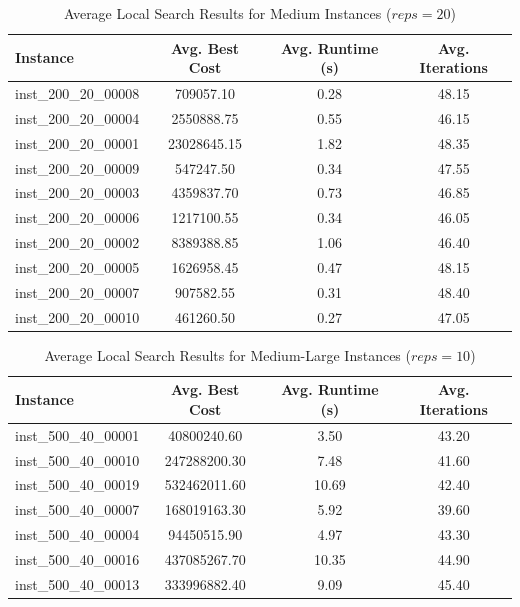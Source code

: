 \documentclass{article}
\begin{document}
\begin{table}[H]
\centering
\caption{Average Local Search Results for Medium Instances ($reps = 20$)}
\hspace*{-1cm}
\begin{tabular}{lccc}
\toprule
\textbf{Instance} & \textbf{Avg. Best Cost} & \textbf{Avg. Runtime (s)} & \textbf{Avg. Iterations} \\
\midrule
inst\_200\_20\_00008 & 709057.10   & 0.28  & 48.15 \\
inst\_200\_20\_00004 & 2550888.75  & 0.55  & 46.15 \\
inst\_200\_20\_00001 & 23028645.15 & 1.82  & 48.35 \\
inst\_200\_20\_00009 & 547247.50   & 0.34  & 47.55 \\
inst\_200\_20\_00003 & 4359837.70  & 0.73  & 46.85 \\
inst\_200\_20\_00006 & 1217100.55  & 0.34  & 46.05 \\
inst\_200\_20\_00002 & 8389388.85  & 1.06  & 46.40 \\
inst\_200\_20\_00005 & 1626958.45  & 0.47  & 48.15 \\
inst\_200\_20\_00007 & 907582.55   & 0.31  & 48.40 \\
inst\_200\_20\_00010 & 461260.50   & 0.27  & 47.05 \\
\bottomrule
\end{tabular}
\label{tab:average_results_200_20}
\end{table}

\begin{table}[H]
\centering
\caption{Average Local Search Results for Medium-Large Instances ($reps=10$)}
\hspace*{-1cm}
\begin{tabular}{lccc}
\toprule
\textbf{Instance} & \textbf{Avg. Best Cost} & \textbf{Avg. Runtime (s)} & \textbf{Avg. Iterations} \\
\midrule
inst\_500\_40\_00001 & 40800240.60   & 3.50  & 43.20 \\
inst\_500\_40\_00010 & 247288200.30  & 7.48  & 41.60 \\
inst\_500\_40\_00019 & 532462011.60  & 10.69 & 42.40 \\
inst\_500\_40\_00007 & 168019163.30  & 5.92  & 39.60 \\
inst\_500\_40\_00004 & 94450515.90   & 4.97  & 43.30 \\
inst\_500\_40\_00016 & 437085267.70  & 10.35 & 44.90 \\
inst\_500\_40\_00013 & 333996882.40  & 9.09  & 45.40 \\
\bottomrule
\end{tabular}
\label{tab:average_results_500_40}
\end{table}
\end{document}

